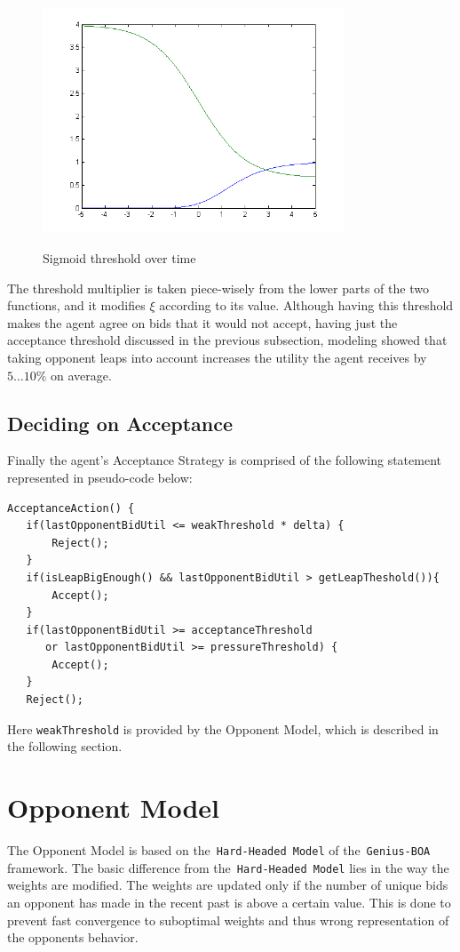 \documentclass[html]{report}    %
\begin{document}
\begin{figure}[htbp]
  \caption{Sigmoid threshold over time}
  \centering
    \includegraphics[width=0.8\textwidth]{sigmoidfigure}
    \label{sigmoid}
\end{figure}
The threshold multiplier is taken piece-wisely from the lower parts of the two functions, and it modifies $\xi$ according to its value. Although having this threshold makes the agent agree on bids that it would not accept, having just the acceptance threshold discussed in the previous subsection, modeling showed that taking opponent leaps into account increases the utility the agent receives by $5\dots10\%$ on average.

\subsection{Deciding on Acceptance}
Finally the agent's Acceptance Strategy is comprised of the following statement represented in pseudo-code below:
\begin{verbatim}
AcceptanceAction() {
   if(lastOpponentBidUtil <= weakThreshold * delta) {
       Reject();
   }
   if(isLeapBigEnough() && lastOpponentBidUtil > getLeapTheshold()){
       Accept();
   }
   if(lastOpponentBidUtil >= acceptanceThreshold 
      or lastOpponentBidUtil >= pressureThreshold) {
       Accept();
   }
   Reject();
\end{verbatim}
Here \texttt{weakThreshold} is provided by the Opponent Model, which is described in the following section.

\section{Opponent Model}  

The Opponent Model is based on the~\texttt{Hard-Headed Model} of the~\texttt{Genius-BOA} framework. The basic difference from the~\texttt{Hard-Headed Model} lies in the way the weights are modified. The weights are updated only if the number of unique bids an opponent has made in the recent past is above a certain value. This is done to prevent fast convergence to suboptimal weights and thus wrong representation of the opponents behavior.
\end{document}
